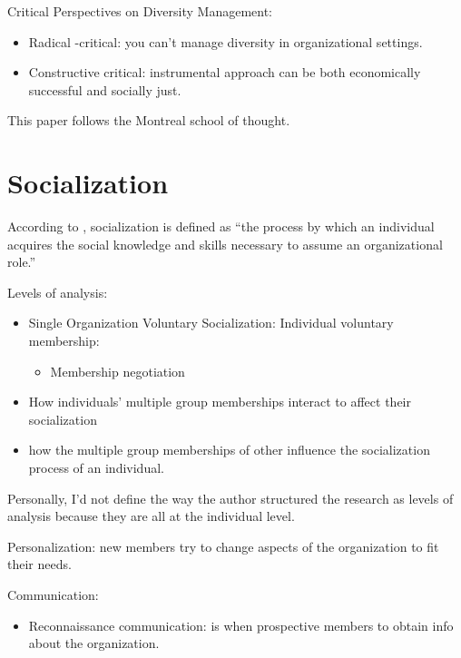 \documentclass[
]{book}
\providecommand{\tightlist}{%
  \setlength{\itemsep}{0pt}\setlength{\parskip}{0pt}}
\begin{document}
Critical Perspectives on Diversity Management:

\begin{itemize}
\tightlist
\item
  Radical -critical: you can't manage diversity in organizational settings.
\item
  Constructive critical: instrumental approach can be both economically successful and socially just.
\end{itemize}

This paper follows the Montreal school of thought.

\hypertarget{socialization}{%
\chapter{Socialization}\label{socialization}}

\citep{Kramer_2011}

According to \citep{Van_Maanen_1979}, socialization is defined as ``the process by which an individual acquires the social
knowledge and skills necessary to assume an organizational role.''

Levels of analysis:

\begin{itemize}
\item
  Single Organization Voluntary Socialization: Individual voluntary membership:

  \begin{itemize}
  \tightlist
  \item
    Membership negotiation
  \end{itemize}
\item
  How individuals' multiple group memberships interact to affect their socialization
\item
  how the multiple group memberships of other influence the socialization process of an individual.
\end{itemize}

Personally, I'd not define the way the author structured the research as levels of analysis because they are all at the
individual level.

Personalization: new members try to change aspects of the organization to fit their needs.

Communication:

\begin{itemize}
\tightlist
\item
  Reconnaissance communication: is when prospective members to obtain info about the organization.
\end{itemize}
\end{document}
